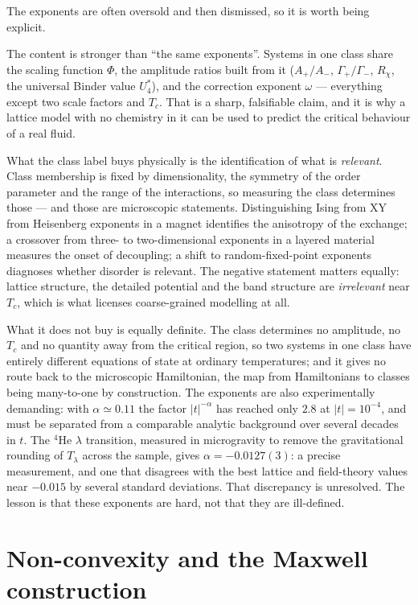 \documentclass[10pt,a4paper]{article}
\theoremstyle{remark}
\begin{document}
The exponents are often oversold and then dismissed, so it is worth being
explicit.

The content is stronger than ``the same exponents''. Systems in one class share
the scaling function $\Phi$, the amplitude ratios built from it
($A_+/A_-$, $\Gamma_+/\Gamma_-$, $R_\chi$, the universal Binder value
$U_4^{\ast}$), and the correction exponent $\omega$ --- everything except two
scale factors and $T_c$. That is a sharp, falsifiable claim, and it is why a
lattice model with no chemistry in it can be used to predict the critical
behaviour of a real fluid.

What the class label buys physically is the identification of what is
\emph{relevant}. Class membership is fixed by dimensionality, the symmetry of the
order parameter and the range of the interactions, so measuring the class
determines those --- and those are microscopic statements. Distinguishing Ising
from XY from Heisenberg exponents in a magnet identifies the anisotropy of the
exchange; a crossover from three- to two-dimensional exponents in a layered
material measures the onset of decoupling; a shift to random-fixed-point
exponents diagnoses whether disorder is relevant. The negative statement matters
equally: lattice structure, the detailed potential and the band structure are
\emph{irrelevant} near $T_c$, which is what licenses coarse-grained modelling at
all.

What it does not buy is equally definite. The class determines no amplitude, no
$T_c$ and no quantity away from the critical region, so two systems in one class
have entirely different equations of state at ordinary temperatures; and it gives
no route back to the microscopic Hamiltonian, the map from Hamiltonians to
classes being many-to-one by construction. The exponents are also experimentally
demanding: with $\alpha\simeq0.11$ the factor $|t|^{-\alpha}$ has reached only
$2.8$ at $|t|=10^{-4}$, and must be separated from a comparable analytic
background over several decades in $t$. The ${}^{4}$He $\lambda$ transition,
measured in microgravity to remove the gravitational rounding of $T_\lambda$
across the sample, gives $\alpha=-0.0127(3)$: a precise measurement, and one that
disagrees with the best lattice and field-theory values near $-0.015$ by several
standard deviations. That discrepancy is unresolved. The lesson is that these
exponents are hard, not that they are ill-defined.


\section{Non-convexity and the Maxwell construction}
\label{app:maxwell}
\end{document}
